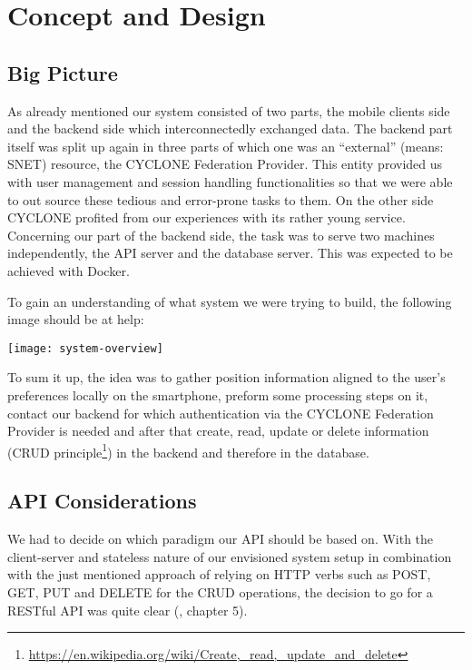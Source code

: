 \chapter{Concept and Design}
\label{cha:conceptanddesign}


\section{Big Picture}

As already mentioned our system consisted of two parts, the mobile clients side and the backend side which interconnectedly exchanged data. The backend part itself was split up again in three parts of which one was an \enquote{external} (means: SNET) resource, the CYCLONE Federation Provider. This entity provided us with user management and session handling functionalities so that we were able to out source these tedious and error-prone tasks to them. On the other side CYCLONE profited from our experiences with its rather young service. Concerning our part of the backend side, the task was to serve two machines independently, the API server and the database server. This was expected to be achieved with Docker.

To gain an understanding of what system we were trying to build, the following image should be at help:

\begin{center}
    \texttt{[image: system-overview]}\\
    \label{fig:system-overview}
\end{center}

To sum it up, the idea was to gather position information aligned to the user's preferences locally on the smartphone, preform some processing steps on it, contact our backend for which authentication via the CYCLONE Federation Provider is needed and after that create, read, update or delete information (CRUD principle\footnote{\url{https://en.wikipedia.org/wiki/Create,_read,_update_and_delete}}) in the backend and therefore in the database.


\vspace{0.5cm}

\section{API Considerations}

We had to decide on which paradigm our API should be based on. With the client-server and stateless nature of our envisioned system setup in combination with the just mentioned approach of relying on HTTP verbs such as POST, GET, PUT and DELETE for the CRUD operations, the decision to go for a RESTful API was quite clear (\cite{fielding2000architectural}, chapter 5).

